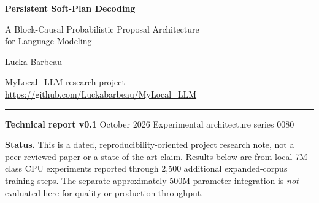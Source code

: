 \documentclass[11pt,letterpaper]{article}
\newcommand{\projecturl}{\url{https://github.com/Luckabarbeau/MyLocal_LLM}}
\begin{document}
\begin{center}
  {\fontsize{22}{27}\selectfont\bfseries\color{navy}Persistent Soft-Plan Decoding}\par\vspace{4pt}
  {\Large\color{bluegray}A Block-Causal Probabilistic Proposal Architecture\\for Language Modeling}\par\vspace{13pt}
  {\large Lucka Barbeau}\par\vspace{3pt}
  {\small MyLocal\_LLM research project \;\textbullet\; \projecturl}\par\vspace{8pt}
  {\color{teal}\rule{0.75\linewidth}{1.0pt}}\par\vspace{6pt}
  {\small \textbf{Technical report v0.1}  October 2026 \quad Experimental architecture series 0080}\par
\end{center}
\vspace{4pt}
\noindent\colorbox{muted}{\parbox{\dimexpr\linewidth-2\fboxsep\relax}{\vspace{5pt}\small\textbf{Status.} This is a dated, reproducibility-oriented project research note, not a peer-reviewed paper or a state-of-the-art claim. Results below are from local 7M-class CPU experiments reported through 2,500 additional expanded-corpus training steps. The separate approximately 500M-parameter integration is \emph{not} evaluated here for quality or production throughput.\vspace{5pt}}}
\end{document}
